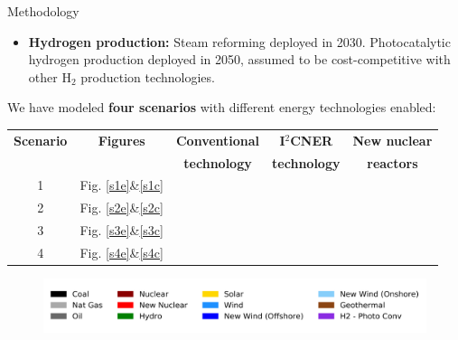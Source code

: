 \documentclass[final]{beamer}
\newlength{\onecolwid}
\newlength{\twocolwid}
\newlength{\threecolwid}
\newcommand{\greencheck}{{\color{green}\checkmark}}
\newcommand{\xmark}{{\color{red}\ding{55}}}
\begin{document}
\begin{frame}[t]
\begin{columns}[t,totalwidth=\threecolwid]
\begin{column}{\twocolwid}
\begin{columns}[t,totalwidth=\twocolwid]
\begin{column}{\onecolwid}
\begin{block}{Methodology}
\begin{itemize}
         \item \textbf{Hydrogen production:} Steam reforming deployed in 2030. Photocatalytic hydrogen production deployed in 2050, assumed to be cost-competitive with other H$_2$ production technologies. \cite{kato_energy_2016} \cite{acar_comparative_2014} \\
         

 \end{itemize} 
 
We have modeled \textbf{four scenarios} with different energy technologies enabled: \hfill \break

\begin{tabular}{c c c c c}

\textbf{Scenario} & \textbf{Figures}         & \textbf{Conventional}      & \textbf{I$^2$CNER}   & \textbf{New nuclear} \\
                  &                          & \textbf{technology}        &  \textbf{technology} & \textbf{reactors}    \\
1                 & Fig. \ref{s1e}\&\ref{s1c}&      \greencheck           &         \xmark       &      \greencheck     \\ 
2                 & Fig. \ref{s2e}\&\ref{s2c}&      \greencheck           &         \xmark       &         \xmark       \\ 
3                 & Fig. \ref{s3e}\&\ref{s3c}&      \greencheck           &      \greencheck     &      \greencheck     \\ 
4                 & Fig. \ref{s4e}\&\ref{s4c}&      \greencheck           &      \greencheck     &         \xmark       \\
\end{tabular}

\end{block}


\begin{figure}[H] 
\centering
\includegraphics[scale=1.2]{legend}
\label{legend}
\end{figure}


\end{column}
\end{columns}
\end{column}
\end{columns}
\end{frame}
\end{document}
